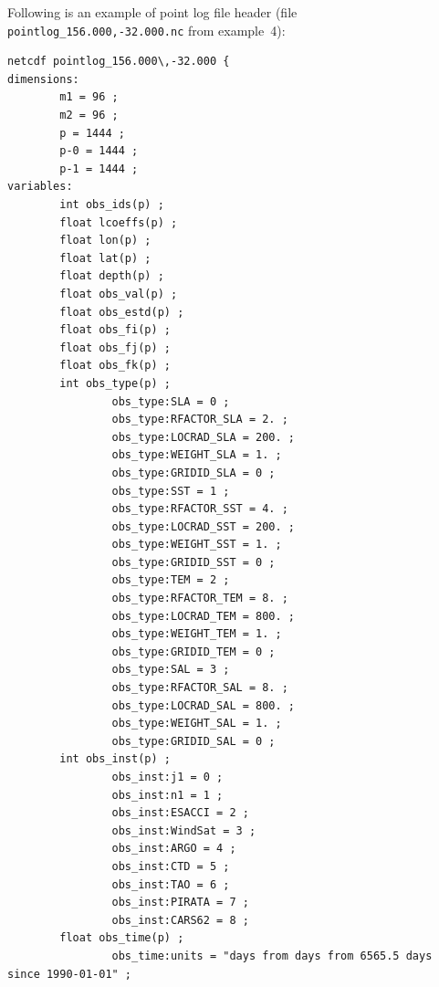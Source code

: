 \documentclass[11pt]{report}
\begin{document}
Following is an example of point log file header (file \verb|pointlog_156.000,-32.000.nc| from example~4):
\begin{Verbatim}[frame=single,fontsize=\footnotesize]
netcdf pointlog_156.000\,-32.000 {
dimensions:
        m1 = 96 ;
        m2 = 96 ;
        p = 1444 ;
        p-0 = 1444 ;
        p-1 = 1444 ;
variables:
        int obs_ids(p) ;
        float lcoeffs(p) ;
        float lon(p) ;
        float lat(p) ;
        float depth(p) ;
        float obs_val(p) ;
        float obs_estd(p) ;
        float obs_fi(p) ;
        float obs_fj(p) ;
        float obs_fk(p) ;
        int obs_type(p) ;
                obs_type:SLA = 0 ;
                obs_type:RFACTOR_SLA = 2. ;
                obs_type:LOCRAD_SLA = 200. ;
                obs_type:WEIGHT_SLA = 1. ;
                obs_type:GRIDID_SLA = 0 ;
                obs_type:SST = 1 ;
                obs_type:RFACTOR_SST = 4. ;
                obs_type:LOCRAD_SST = 200. ;
                obs_type:WEIGHT_SST = 1. ;
                obs_type:GRIDID_SST = 0 ;
                obs_type:TEM = 2 ;
                obs_type:RFACTOR_TEM = 8. ;
                obs_type:LOCRAD_TEM = 800. ;
                obs_type:WEIGHT_TEM = 1. ;
                obs_type:GRIDID_TEM = 0 ;
                obs_type:SAL = 3 ;
                obs_type:RFACTOR_SAL = 8. ;
                obs_type:LOCRAD_SAL = 800. ;                                                                   
                obs_type:WEIGHT_SAL = 1. ;                                                                     
                obs_type:GRIDID_SAL = 0 ;                                                                      
        int obs_inst(p) ;                                                                                      
                obs_inst:j1 = 0 ;                                                                              
                obs_inst:n1 = 1 ;                                                                              
                obs_inst:ESACCI = 2 ;                                                                          
                obs_inst:WindSat = 3 ;                                                                         
                obs_inst:ARGO = 4 ;                                                                            
                obs_inst:CTD = 5 ;
                obs_inst:TAO = 6 ;
                obs_inst:PIRATA = 7 ;
                obs_inst:CARS62 = 8 ;
        float obs_time(p) ;
                obs_time:units = "days from days from 6565.5 days since 1990-01-01" ;

\end{Verbatim}
\end{document}
